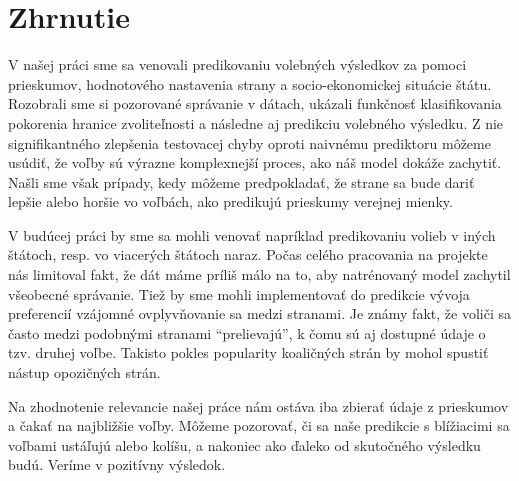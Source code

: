\documentclass[report.tex]{subfiles}
\begin{document}
	
\section{Zhrnutie}	

V našej práci sme sa venovali predikovaniu volebných výsledkov za pomoci prieskumov, hodnotového nastavenia strany a socio-ekonomickej situácie štátu. Rozobrali sme si pozorované správanie v dátach, ukázali funkčnosť klasifikovania pokorenia hranice zvoliteľnosti a následne aj predikciu volebného výsledku. Z nie signifikantného zlepšenia testovacej chyby oproti naivnému prediktoru môžeme usúdiť, že voľby sú výrazne komplexnejší proces, ako náš model dokáže zachytiť. Našli sme však prípady, kedy môžeme predpokladať, že strane sa bude dariť lepšie alebo horšie vo voľbách, ako predikujú prieskumy verejnej mienky.

V budúcej práci by sme sa mohli venovať napríklad predikovaniu volieb v iných štátoch, resp. vo viacerých štátoch naraz. Počas celého pracovania na projekte nás limitoval fakt, že dát máme príliš málo na to, aby natrénovaný model zachytil všeobecné správanie. Tiež by sme mohli implementovať do predikcie vývoja preferencií vzájomné ovplyvňovanie sa medzi stranami. Je známy fakt, že voliči sa často medzi podobnými stranami \enquote{prelievajú}, k čomu sú aj dostupné údaje o tzv. druhej voľbe. Takisto pokles popularity koaličných strán by mohol spustiť nástup opozičných strán. 

Na zhodnotenie relevancie našej práce nám ostáva iba zbierať údaje z prieskumov a čakať na najbližšie voľby. Môžeme pozorovať, či sa naše predikcie s blížiacimi sa voľbami ustáľujú alebo kolíšu, a nakoniec ako ďaleko od skutočného výsledku budú. Veríme v pozitívny výsledok.
\end{document}
